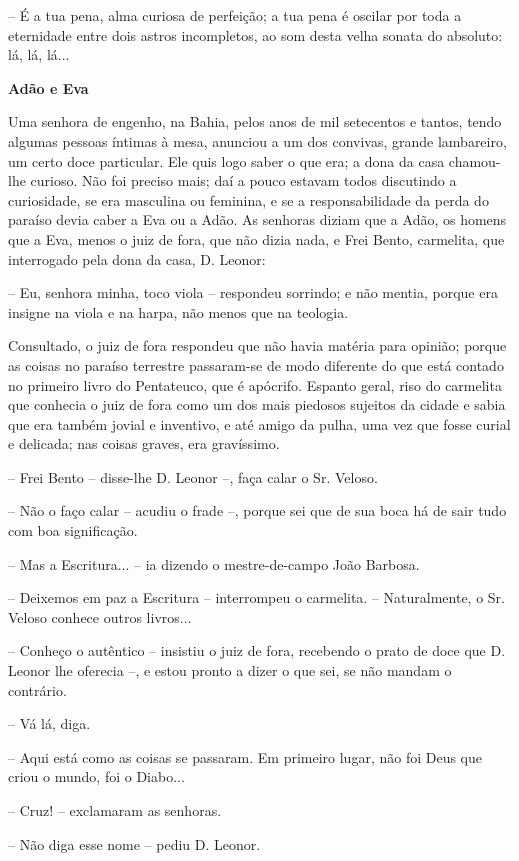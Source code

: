-- É a tua pena, alma curiosa de perfeição; a tua pena é oscilar por
toda a eternidade entre dois astros incompletos, ao som desta velha
sonata do absoluto: lá, lá, lá...

\textbf{Adão e Eva}

Uma senhora de engenho, na Bahia, pelos anos de mil setecentos e tantos,
tendo algumas pessoas íntimas à mesa, anunciou a um dos convivas, grande
lambareiro, um certo doce particular. Ele quis logo saber o que era; a
dona da casa chamou-lhe curioso. Não foi preciso mais; daí a pouco
estavam todos discutindo a curiosidade, se era masculina ou feminina, e
se a responsabilidade da perda do paraíso devia caber a Eva ou a Adão.
As senhoras diziam que a Adão, os homens que a Eva, menos o juiz de
fora, que não dizia nada, e Frei Bento, carmelita, que interrogado pela
dona da casa, D. Leonor:

-- Eu, senhora minha, toco viola -- respondeu sorrindo; e não mentia,
porque era insigne na viola e na harpa, não menos que na teologia.

Consultado, o juiz de fora respondeu que não havia matéria para opinião;
porque as coisas no paraíso terrestre passaram-se de modo diferente do
que está contado no primeiro livro do Pentateuco, que é apócrifo.
Espanto geral, riso do carmelita que conhecia o juiz de fora como um dos
mais piedosos sujeitos da cidade e sabia que era também jovial e
inventivo, e até amigo da pulha, uma vez que fosse curial e delicada;
nas coisas graves, era gravíssimo.

-- Frei Bento -- disse-lhe D. Leonor --, faça calar o Sr. Veloso.

-- Não o faço calar -- acudiu o frade --, porque sei que de sua boca há
de sair tudo com boa significação.

-- Mas a Escritura... -- ia dizendo o mestre-de-campo João Barbosa.

-- Deixemos em paz a Escritura -- interrompeu o carmelita. --
Naturalmente, o Sr. Veloso conhece outros livros...

-- Conheço o autêntico -- insistiu o juiz de fora, recebendo o prato de
doce que D. Leonor lhe oferecia --, e estou pronto a dizer o que sei, se
não mandam o contrário.

-- Vá lá, diga.

-- Aqui está como as coisas se passaram. Em primeiro lugar, não foi Deus
que criou o mundo, foi o Diabo...

-- Cruz! -- exclamaram as senhoras.

-- Não diga esse nome -- pediu D. Leonor.

